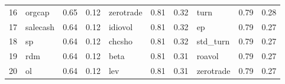 \documentclass[12pt]{article}
\begin{document}
\begin{landscape}
\begin{footnotesize}
\begin{longtable}{l|lcc|lcc|lcc}
			16                    & orgcap                      & 0.65                                                                                 & 0.12                            & zerotrade                   & 0.81                                                                                 & 0.32                            & turn                        & 0.79                                                                                 & 0.28                           \\
			17                    & salecash                    & 0.64                                                                                 & 0.12                            & idiovol                     & 0.81                                                                                 & 0.32                            & ep                          & 0.79                                                                                 & 0.27                           \\
			18                    & sp                          & 0.64                                                                                 & 0.12                            & chcsho                      & 0.81                                                                                 & 0.32                            & std\_turn                   & 0.79                                                                                 & 0.27                           \\
			19                    & rdm                         & 0.64                                                                                 & 0.12                            & beta                        & 0.81                                                                                 & 0.31                            & roavol                      & 0.79                                                                                 & 0.27                           \\
			20                    & ol                          & 0.64                                                                                 & 0.12                            & lev                         & 0.81                                                                                 & 0.31                            & zerotrade                   & 0.79                                                                                 & 0.27                           \\

\end{longtable}
\end{footnotesize}
\end{landscape}
\end{document}
